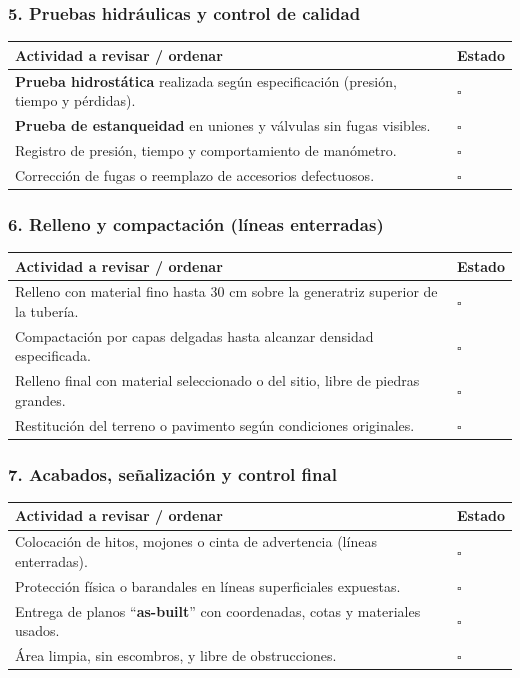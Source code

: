 \documentclass[12pt]{article}
\newcommand{\cbox}{\(\square\)}
\renewcommand{\cbox}{\(\square\)} %
\begin{document}
	\subsubsection*{5. Pruebas hidráulicas y control de calidad}
	\begin{tabularx}{\linewidth}{>{\raggedright\arraybackslash}p{0.93\linewidth} >{\centering\arraybackslash}m{0.07\linewidth}}
		\toprule
		\textbf{Actividad a revisar / ordenar} & \textbf{Estado}\\
		\midrule
		\textbf{Prueba hidrostática} realizada según especificación (presión, tiempo y pérdidas). & \cbox \\
		\textbf{Prueba de estanqueidad} en uniones y válvulas sin fugas visibles. & \cbox \\
		Registro de presión, tiempo y comportamiento de manómetro. & \cbox \\
		Corrección de fugas o reemplazo de accesorios defectuosos. & \cbox \\
		\bottomrule
	\end{tabularx}
	
	\subsubsection*{6. Relleno y compactación (líneas enterradas)}
	\begin{tabularx}{\linewidth}{>{\raggedright\arraybackslash}p{0.93\linewidth} >{\centering\arraybackslash}m{0.07\linewidth}}
		\toprule
		\textbf{Actividad a revisar / ordenar} & \textbf{Estado}\\
		\midrule
		Relleno con material fino hasta 30 cm sobre la generatriz superior de la tubería. & \cbox \\
		Compactación por capas delgadas hasta alcanzar densidad especificada. & \cbox \\
		Relleno final con material seleccionado o del sitio, libre de piedras grandes. & \cbox \\
		Restitución del terreno o pavimento según condiciones originales. & \cbox \\
		\bottomrule
	\end{tabularx}
	
	\subsubsection*{7. Acabados, señalización y control final}
	\begin{tabularx}{\linewidth}{>{\raggedright\arraybackslash}p{0.93\linewidth} >{\centering\arraybackslash}m{0.07\linewidth}}
		\toprule
		\textbf{Actividad a revisar / ordenar} & \textbf{Estado}\\
		\midrule
		Colocación de hitos, mojones o cinta de advertencia (líneas enterradas). & \cbox \\
		Protección física o barandales en líneas superficiales expuestas. & \cbox \\
		Entrega de planos “\textbf{as-built}” con coordenadas, cotas y materiales usados. & \cbox \\
		Área limpia, sin escombros, y libre de obstrucciones. & \cbox \\
		\bottomrule
	\end{tabularx}
	
\end{document}
